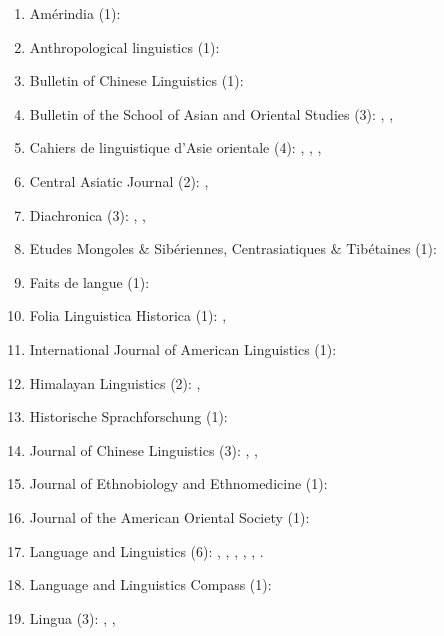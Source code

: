 \documentclass[oneside,a4paper,11pt]{article}
\begin{document}
 \begin{enumerate}
 \item Amérindia (1): \citet{jacques12bear}
 \item Anthropological linguistics (1): \citet{japhug14ideophones}
 \item Bulletin of Chinese Linguistics (1): \citet{jacques15derivational.khaling}
 \item Bulletin of the School of Asian and Oriental Studies (3):  \citet{jacques10refl}, \citet{rg-gj12yod}, \citet{jacques13yod}
 \item Cahiers de linguistique d'Asie orientale (4): \citet{jacques00ywij},  \citet{jacques03dissimilation},   \citet{jacques07chang},  \citet{michaud10bonin}
 \item Central Asiatic Journal (2):  \citet{jacques10imperial}, \citet{jacques14ergative}
  \item Diachronica (3): \citet{jacques.michaud11naish}, \citet{michaud-jacques12nasalite}, \citet{jacques16comparative}
  \item Etudes Mongoles \& Sibériennes, Centrasiatiques \& Tibétaines (1):  \citet{jacques09e}
  \item Faits de langue (1): \citet{jacques07redupl}
 \item Folia Linguistica Historica (1): \citet{jacques13arapaho}, \citet{jacques15causative}
 \item International Journal of American Linguistics (1): \citet{jacques16ebde}
 \item Himalayan Linguistics (2): \citet{jacques10zos},  \citet{jacques14rtau}
 \item Historische Sprachforschung (1): \citet{jacques15cochon}
 \item Journal of Chinese Linguistics (3):   \citet{jacques11tangut.verb}, \citet{jacques15sr}, \citet{jacques16relatives}
 \item Journal of Ethnobiology and Ethnomedicine (1): \citet{Kang2016}
 \item Journal of the American Oriental Society (1): \citet{jacques11ngwemi}
   \item Language and Linguistics (6):  \citet{jacques07passif}, \citet{jacques09tangutverb}, \citet{jacques10inverse},     \citet{jacques11pumi.tone}, \citet{jacques12agreement},    \citet{jacques12khaling}.  
   \item  Language and Linguistics Compass (1): \citet{jacques14inverse}   
 \item Lingua (3):  \citet{jacques11lingua}, \citet{jacques12incorp}, \citet{jacques14antipassive}

\end{enumerate}
\end{document}
